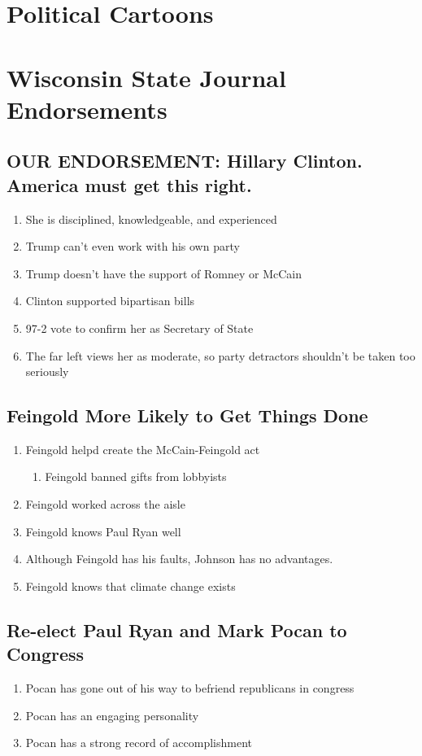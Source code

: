 \documentclass[twoside]{article}
\begin{document}
\section{Political Cartoons}
\newpage
\section{Wisconsin State Journal Endorsements}
\subsection{OUR ENDORSEMENT: Hillary Clinton. America must get this right.
}
\begin{enumerate}[*]
    \item She is disciplined, knowledgeable, and experienced
    \item Trump can’t even work with his own party
    \item Trump doesn’t have the support of Romney or McCain
    \item Clinton supported bipartisan bills
    \item 97-2 vote to confirm her as Secretary of State
    \item The far left views her as moderate, so party detractors shouldn’t be taken too seriously
\end{enumerate}
\subsection{Feingold More Likely to Get Things Done
}
\begin{enumerate}[*]
    \item Feingold helpd create the McCain-Feingold act
    \begin{enumerate}[-]
        \item Feingold banned gifts from lobbyists
    \end{enumerate}
    \item Feingold worked across the aisle
    \item Feingold knows Paul Ryan well
    \item Although Feingold has his faults, Johnson has no advantages.
    \item Feingold knows that climate change exists
\end{enumerate}
\subsection{Re-elect Paul Ryan and Mark Pocan to Congress
}
\begin{enumerate}[*]
    \item Pocan has gone out of his way to befriend republicans in congress
    \item Pocan has an engaging personality
    \item Pocan has a strong record of accomplishment
\end{enumerate}
\end{document}
